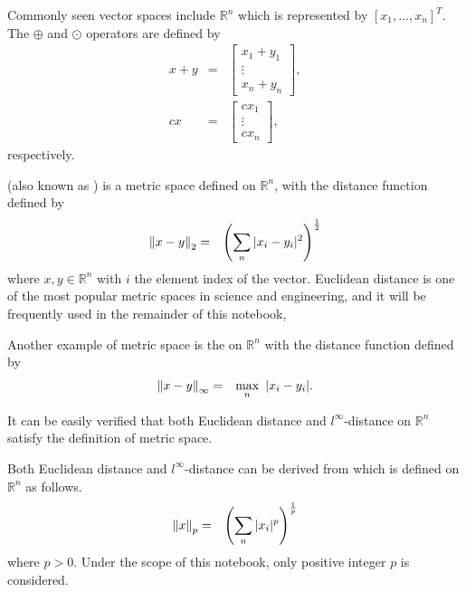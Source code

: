 Commonly seen vector spaces include $\mathbb{R}^n$ which is represented by $[x_1, \ldots, x_n]^T$. The $\oplus$ and $\odot$ operators are defined by
\begin{eqnarray}
  x + y &=& \left[\begin{array}{c}
                    x_1 + y_1 \\
                    \vdots \\
                    x_n + y_n 
                  \end{array}\right], \nonumber \\
  cx &=& \left[\begin{array}{c}
                 cx_1 \\
                 \vdots \\
                 cx_n 
               \end{array}\right], \nonumber
\end{eqnarray}
respectively.

 (also known as ) is a metric space defined on $\mathbb{R}^n$, with the distance function defined by
\begin{eqnarray}
	\left\lVert x-y\right\rVert_2 &=& \left(\sum_n|x_i-y_i|^2\right)^{\frac{1}{2}} \label{eq:euclidean-distance}
\end{eqnarray}
where $x,y\in\mathbb{R}^n$ with $i$ the element index of the vector. Euclidean distance is one of the most popular metric spaces in science and engineering, and it will be frequently used in the remainder of this notebook, 

Another example of metric space is the  on $\mathbb{R}^n$ with the distance function defined by
\begin{eqnarray}
	\left\lVert x-y\right\rVert_\infty &=& \max_{n}~|x_i - y_i|. \label{eq:l-infinity-distance}
\end{eqnarray}

It can be easily verified that both Euclidean distance and $l^\infty$-distance on $\mathbb{R}^n$ satisfy the definition of metric space.

Both Euclidean distance and $l^\infty$-distance can be derived from  which is defined on $\mathbb{R}^n$ as follows.
\begin{eqnarray}
	\left\lVert x\right\rVert_p &=& \left(\sum_n |x_i|^p\right)^{\frac{1}{p}} \label{eq:p-norm}
\end{eqnarray}
where $p>0$. Under the scope of this notebook, only positive integer $p$ is considered.


